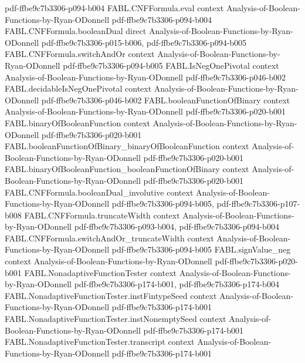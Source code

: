\begin{theorem}
  {pdf-ffbe9c7b3306-p094-b004}
\proofstep
  {FABL.CNFFormula.eval}
  {context}
  {Analysis-of-Boolean-Functions-by-Ryan-ODonnell}
  {pdf-ffbe9c7b3306-p094-b004}
\proofstep
  {FABL.CNFFormula.booleanDual}
  {direct}
  {Analysis-of-Boolean-Functions-by-Ryan-ODonnell}
  {pdf-ffbe9c7b3306-p015-b006,
    pdf-ffbe9c7b3306-p094-b005}
\proofstep
  {FABL.CNFFormula.switchAndOr}
  {context}
  {Analysis-of-Boolean-Functions-by-Ryan-ODonnell}
  {pdf-ffbe9c7b3306-p094-b005}
\proofstep
  {FABL.IsNegOnePivotal}
  {context}
  {Analysis-of-Boolean-Functions-by-Ryan-ODonnell}
  {pdf-ffbe9c7b3306-p046-b002}
\proofstep
  {FABL.decidableIsNegOnePivotal}
  {context}
  {Analysis-of-Boolean-Functions-by-Ryan-ODonnell}
  {pdf-ffbe9c7b3306-p046-b002}
\proofstep
  {FABL.booleanFunctionOfBinary}
  {context}
  {Analysis-of-Boolean-Functions-by-Ryan-ODonnell}
  {pdf-ffbe9c7b3306-p020-b001}
\proofstep
  {FABL.binaryOfBooleanFunction}
  {context}
  {Analysis-of-Boolean-Functions-by-Ryan-ODonnell}
  {pdf-ffbe9c7b3306-p020-b001}
\proofstep
  {FABL.booleanFunctionOfBinary_binaryOfBooleanFunction}
  {context}
  {Analysis-of-Boolean-Functions-by-Ryan-ODonnell}
  {pdf-ffbe9c7b3306-p020-b001}
\proofstep
  {FABL.binaryOfBooleanFunction_booleanFunctionOfBinary}
  {context}
  {Analysis-of-Boolean-Functions-by-Ryan-ODonnell}
  {pdf-ffbe9c7b3306-p020-b001}
\proofstep
  {FABL.CNFFormula.booleanDual_involutive}
  {context}
  {Analysis-of-Boolean-Functions-by-Ryan-ODonnell}
  {pdf-ffbe9c7b3306-p094-b005,
    pdf-ffbe9c7b3306-p107-b008}
\proofstep
  {FABL.CNFFormula.truncateWidth}
  {context}
  {Analysis-of-Boolean-Functions-by-Ryan-ODonnell}
  {pdf-ffbe9c7b3306-p093-b004,
    pdf-ffbe9c7b3306-p094-b004}
\proofstep
  {FABL.CNFFormula.switchAndOr_truncateWidth}
  {context}
  {Analysis-of-Boolean-Functions-by-Ryan-ODonnell}
  {pdf-ffbe9c7b3306-p094-b005}
\proofstep
  {FABL.signValue_neg}
  {context}
  {Analysis-of-Boolean-Functions-by-Ryan-ODonnell}
  {pdf-ffbe9c7b3306-p020-b001}
\proofstep
  {FABL.NonadaptiveFunctionTester}
  {context}
  {Analysis-of-Boolean-Functions-by-Ryan-ODonnell}
  {pdf-ffbe9c7b3306-p174-b001,
    pdf-ffbe9c7b3306-p174-b004}
\proofstep
  {FABL.NonadaptiveFunctionTester.instFintypeSeed}
  {context}
  {Analysis-of-Boolean-Functions-by-Ryan-ODonnell}
  {pdf-ffbe9c7b3306-p174-b001}
\proofstep
  {FABL.NonadaptiveFunctionTester.instNonemptySeed}
  {context}
  {Analysis-of-Boolean-Functions-by-Ryan-ODonnell}
  {pdf-ffbe9c7b3306-p174-b001}
\proofstep
  {FABL.NonadaptiveFunctionTester.transcript}
  {context}
  {Analysis-of-Boolean-Functions-by-Ryan-ODonnell}
  {pdf-ffbe9c7b3306-p174-b001}

\end{theorem}
